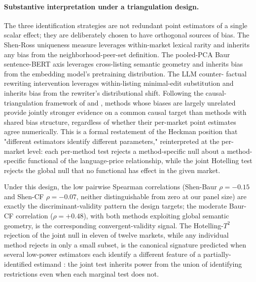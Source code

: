 \paragraph{Substantive interpretation under a triangulation
design.} The three identification strategies are not redundant point
estimators of a single scalar effect; they are deliberately chosen
to have orthogonal sources of bias.  The Shen-Ross uniqueness measure
leverages within-market lexical rarity and inherits any bias from the
neighborhood-peer-set definition.  The pooled-PCA Baur sentence-BERT
axis leverages cross-listing semantic geometry and inherits bias from
the embedding model's pretraining distribution.  The LLM counter-
factual rewriting intervention leverages within-listing minimal-edit
substitution and inherits bias from the rewriter's distributional
shift.  Following the causal-triangulation framework of
\citet{lawlor2016triangulation} and \citet{hammerton2021causal},
methods whose biases are largely unrelated provide jointly stronger
evidence on a common causal target than methods with shared bias
structure, regardless of whether their per-market point estimates
agree numerically.  This is a formal restatement of the Heckman
\citep{heckman2008econometric} position that "different estimators
identify different parameters," reinterpreted at the per-market
level: each per-method test rejects a method-specific null about a
method-specific functional of the language-price relationship, while
the joint Hotelling test rejects the global null that no functional
has effect in the given market.

Under this design, the low pairwise Spearman correlations (Shen-Baur
$\rho = -0.15$ and Shen-CF $\rho = -0.07$, neither distinguishable
from zero at our panel size) are exactly the discriminant-validity
pattern the design targets; the moderate Baur-CF correlation
($\rho = +0.48$), with both methods exploiting global semantic
geometry, is the corresponding convergent-validity signal.  The
Hotelling-$T^2$ rejection of the joint null in eleven of twelve
markets, while any individual method rejects in only a small
subset, is the canonical signature predicted when several low-power
estimators each identify a different feature of a partially-
identified estimand \citep{manski2003partial, tamer2010partial}: the
joint test inherits power from the union of identifying restrictions
even when each marginal test does not.

